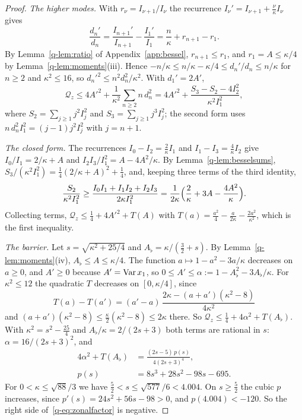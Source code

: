 \begin{proof}
\emph{The higher modes.} With $r_\nu=I_{\nu+1}/I_\nu$ the recurrence
$I_\nu'=I_{\nu+1}+\frac\nu\kappa I_\nu$ gives
\[
\frac{d_n'}{d_n}=\frac{I_{n+1}'}{I_{n+1}}-\frac{I_1'}{I_1}=\frac n\kappa+
r_{n+1}-r_1 .
\]
By Lemma~\ref{q-lem:ratio} of Appendix~\ref{app:bessel}, $r_{n+1}\le r_1$, and
$r_1=A\le\kappa/4$ by Lemma~\ref{q-lem:moments}(iii). Hence $-n/\kappa\le
n/\kappa-\kappa/4\le d_n'/d_n\le n/\kappa$ for $n\ge2$ and $\kappa^2\le16$, so
$d_n'^2\le n^2d_n^2/\kappa^2$. With $d_1'=2A'$,
\[
\mathcal Q_z\le4A'^2+\frac1{\kappa^2}\sum_{n\ge2}n\,d_n^2=4A'^2+\frac{S_3-
S_2-4I_2^2}{\kappa^2I_1^2},
\]
where $S_2=\sum_{j\ge1}j^2I_j^2$ and $S_3=\sum_{j\ge1}j^3I_j^2$; the
second form uses $n\,d_n^2I_1^2=(j-1)j^2I_j^2$ with $j=n+1$.

\emph{The closed form.} The recurrences $I_0-I_2=\frac2\kappa I_1$ and
$I_1-I_3=\frac4\kappa I_2$ give $I_0/I_1=2/\kappa+A$ and $I_2I_3/I_1^2=A-
4A^2/\kappa$. By Lemma~\ref{q-lem:besselsums},
$S_3/(\kappa^2I_1^2)=\frac14(2/\kappa+A)^2+\frac14$, and, keeping three
terms of the third identity,
\[
\frac{S_2}{\kappa^2I_1^2}\ge\frac{I_0I_1+I_1I_2+I_2I_3}{2\kappa I_1^2}=
\frac1{2\kappa}\Bigl(\frac2\kappa+3A-\frac{4A^2}\kappa\Bigr).
\]
Collecting terms, $\mathcal Q_z\le\frac14+4A'^2+T(A)$ with $T(a)=\frac{a^2}4-
\frac a{2\kappa}-\frac{2a^2}{\kappa^2}$, which is the first inequality.

\emph{The barrier.} Let $s=\sqrt{\kappa^2+25/4}$ and $A_\flat=\kappa/(\frac32
+s)$. By Lemma~\ref{q-lem:moments}(iv), $A_\flat\le A\le\kappa/4$. The function
$a\mapsto1-a^2-3a/\kappa$ decreases on $a\ge0$, and $A'\ge0$ because $A'=
\operatorname{Var} x_1$, so $0\le A'\le\alpha:=1-A_\flat^2-3A_\flat/\kappa$. For $\kappa^2\le
12$ the quadratic $T$ decreases on $[0,\kappa/4]$, since
\[
T(a)-T(a')=(a'-a)\,\frac{2\kappa-(a+a')(\kappa^2-8)}{4\kappa^2}
\]
and $(a+a')(\kappa^2-8)\le\frac\kappa2(\kappa^2-8)\le2\kappa$ there. So
$\mathcal Q_z\le\frac14+4\alpha^2+T(A_\flat)$. With $\kappa^2=s^2-\frac{25}4$
and $A_\flat/\kappa=2/(2s+3)$ both terms are rational in $s$:
$\alpha=16/(2s+3)^2$, and
\begin{equation}\label{q-eq:zonalfactor}
\begin{aligned}
4\alpha^2+T(A_\flat)&=\frac{(2s-5)\,p(s)}{4(2s+3)^4},\\
p(s)&=8s^3+28s^2-98s-695 .
\end{aligned}
\end{equation}
For $0<\kappa\le\sqrt{88}/3$ we have $\frac52<s\le\sqrt{577}/6<4.004$. On
$s\ge\frac52$ the cubic $p$ increases, since $p'(s)=24s^2+56s-98>0$, and
$p(4.004)<-120$. So the right side of~\eqref{q-eq:zonalfactor} is negative.
\end{proof}

